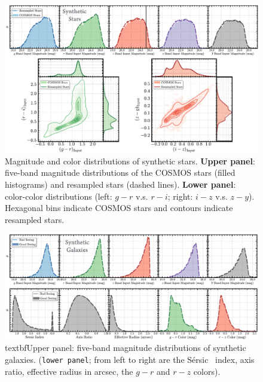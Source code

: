 \documentclass[useamsfonts]{pasj01}
\def\ser{{S\'{e}rsic\ }}
\begin{document}
\begin{figure}
    \begin{center}
        \includegraphics[width=\textwidth]{fig/synpipe_star_sample}
    \end{center}
    \caption{
        Magnitude and color distributions of synthetic stars.
        \textbf{Upper panel}: five-band magnitude distributions of the COSMOS
        stars (filled histograms) and  resampled stars (dashed lines).
        \textbf{Lower panel}: color-color distributions
        (left: $g-r$ v.s. $r-i$; right: $i-z$ v.s. $z-y$). Hexagonal bins indicate COSMOS stars and contours indicate resampled stars.}
    \label{fig:star_sample}
\end{figure}

\begin{figure}
    \begin{center}
        \includegraphics[width=\textwidth]{fig/synpipe_galaxy_sample}
    \end{center}
    \caption{ textbf{Upper panel}: five-band magnitude distributions of synthetic galaxies. (\texttt{lower panel}; from left to right are the \ser{} index, axis ratio,
        effective radius in arcsec, the $g-r$ and $r-z$ colors).}
    \label{fig:galaxy_sample}
\end{figure}
\end{document}
